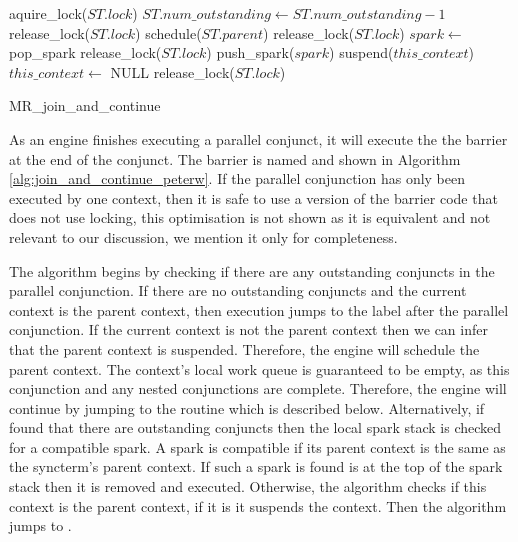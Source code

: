 \begin{algorithm}
\begin{algorithmic}
  \State aquire\_lock($ST.lock$)
  \State $ST.num\_outstanding \gets ST.num\_outstanding - 1$
      \State release\_lock($ST.lock$)
    \Else
      \State schedule($ST.parent$)
      \State release\_lock($ST.lock$)
    \EndIf
  \Else
    \State $spark \gets$ pop\_spark
        \State release\_lock($ST.lock$)
      \EndIf
      \State push\_spark($spark$)
    \EndIf
       \State suspend($this\_context$)
       \State $this\_context \gets$ NULL
    \EndIf
    \State release\_lock($ST.lock$)
  \EndIf
\EndProcedure
\end{algorithmic}
\caption{MR\_join\_and\_continue}
\label{alg:join_and_continue_peterw}
\end{algorithm}


As an engine finishes executing a parallel conjunct,
it will execute the the barrier at the end of the conjunct.
The barrier is named \joinandcontinue and shown in
Algorithm \ref{alg:join_and_continue_peterw}.
If the parallel conjunction has only been executed by
one context,
then it is safe to use a version of the barrier code that does not use
locking,
this optimisation is not shown as it is equivalent and not relevant to
our discussion,
we mention it only for completeness.

The algorithm begins by checking if there are any outstanding conjuncts in
the parallel conjunction.
If there are no outstanding conjuncts and the current context is the parent
context,
then execution jumps to the label after the parallel conjunction.
If the current context is not the parent context then
we can infer that the parent context is suspended.
Therefore,
the engine will schedule the parent context.
The context's local work queue is guaranteed to be empty,
as this conjunction and any nested conjunctions are complete.
Therefore,
the engine will continue by jumping to the \getglobalwork routine
which is described below.
Alternatively,
if \joinandcontinue found that there are outstanding conjuncts then
the local spark stack is checked for a compatible spark.
A spark is compatible if its parent context is the same as the
syncterm's parent context.
If such a spark is found is at the top of the spark stack then it is removed
and executed.
Otherwise,
the algorithm checks if this context is the parent context,
if it is it suspends the context.
Then the algorithm jumps to \getglobalwork.


